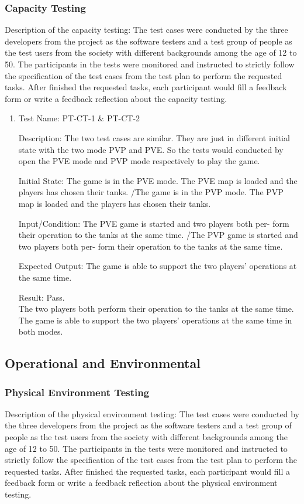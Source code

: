 \documentclass[12pt, titlepage]{article}
\begin{document}
\subsubsection{Capacity Testing}
Description of the capacity testing: The test cases were conducted by the three developers from the project as the software testers and a test group of people as the test users from the society with different backgrounds among the age of 12 to 50. The participants in the tests were monitored and instructed to strictly follow the specification of the test cases from the test plan to perform the requested tasks. After finished the requested tasks, each participant would fill a feedback form or write a feedback reflection about the capacity testing.

\begin{enumerate}

\item{Test Name: PT-CT-1 \& PT-CT-2\\}

Description:  The two test cases are similar. They are just in different initial state with the two mode PVP and PVE. So the tests would conducted by open the PVE mode and PVP mode respectively to play the game.

Initial State: The game is in the PVE mode. The PVE map is loaded and the players has chosen their tanks. /The game is in the PVP mode. The PVP map is loaded and the players has chosen their tanks.

Input/Condition: The PVE game is started and two players both per- form their operation to the tanks at the same time. /The PVP game is started and two players both per- form their operation to the tanks at the same time.

Expected Output: The game is able to support the two players’ operations at the same time.

Result: Pass. \\The two players both perform their operation to the tanks at the same time. The game is able to support the two players’ operations at the same time in both modes.

\end{enumerate}

\subsection{Operational and Environmental}

\subsubsection{Physical Environment Testing}
Description of the physical environment testing: The test cases were conducted by the three developers from the project as the software testers and a test group of people as the test users from the society with different backgrounds among the age of 12 to 50. The participants in the tests were monitored and instructed to strictly follow the specification of the test cases from the test plan to perform the requested tasks. After finished the requested tasks, each participant would fill a feedback form or write a feedback reflection about the physical environment testing.
\end{document}

